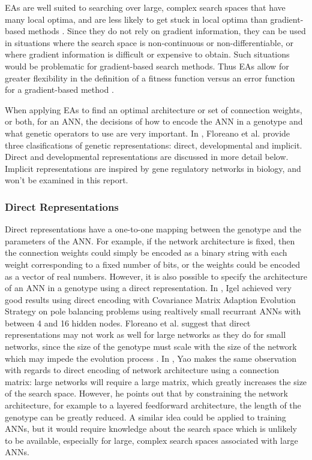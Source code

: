 \documentclass[12pt]{article} %
\begin{document}
EAs are well suited to searching over large, complex search spaces that have many local optima, and are less likely to get stuck in local optima than gradient-based methods \cite{Yao1999}. Since they do not rely on gradient information, they can be used in situations where the search space is non-continuous or non-differentiable, or where gradient information is difficult or expensive to obtain. Such situations would be problematic for gradient-based search methods. Thus EAs allow for greater flexibility in the definition of a fitness function versus an error function for a gradient-based method \cite{Floreano2008}\cite{Yao1999}.

When applying EAs to find an optimal architecture or set of connection weights, or both, for an ANN, the decisions of how to encode the ANN in a genotype and what genetic operators to use are very important. In \cite{Floreano2008}, Floreano et al. provide three clasifications of genetic representations: direct, developmental and implicit. Direct and developmental representations are discussed in more detail below. Implicit representations are inspired by gene regulatory networks in biology, and won't be examined in this report.

\subsubsection{Direct Representations}

Direct representations have a one-to-one mapping between the genotype and the parameters of the ANN. For example, if the network architecture is fixed, then the connection weights could simply be encoded as a binary string with each weight corresponding to a fixed number of bits, or the weights could be encoded as a vector of real numbers. However, it is also possible to specify the architecture of an ANN in a genotype using a direct representation. In \cite{Igel2003}, Igel achieved very good results using direct encoding with Covariance Matrix Adaption Evolution Strategy on pole balancing problems using realtively small recurrant ANNs with between 4 and 16 hidden nodes. Floreano et al. suggest that direct representations may not work as well for large networks as they do for small networks, since the size of the genotype must scale with the size of the network which may impede the evolution process \cite{Floreano2008}. In \cite{Yao1999}, Yao makes the same observation with regards to direct encoding of network architecture using a connection matrix: large networks will require a large matrix, which greatly increases the size of the search space. However, he points out that by constraining the network architecture, for example to a layered feedforward architecture, the length of the genotype can be greatly reduced. A similar idea could be applied to training ANNs, but it would require knowledge about the search space which is unlikely to be available, especially for large, complex search spaces associated with large ANNs.
\end{document}
